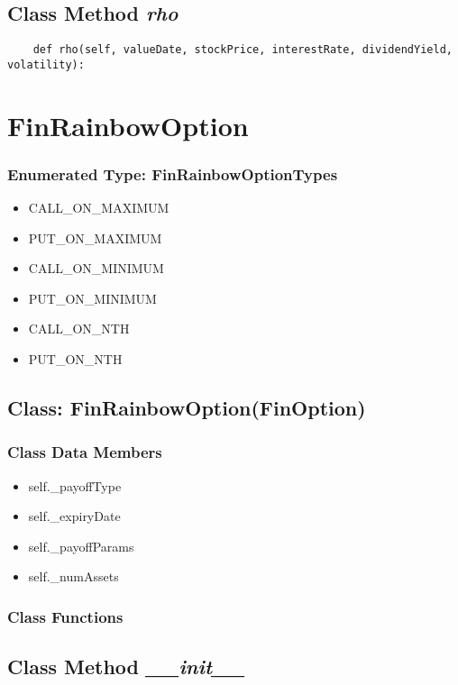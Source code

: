 \documentclass[twoside,11pt]{book}
\begin{document}
\subsection{Class Method {\it rho}}


\begin{lstlisting}
    def rho(self, valueDate, stockPrice, interestRate, dividendYield, volatility):
\end{lstlisting}

\newpage
\section{FinRainbowOption}

\subsubsection{Enumerated Type: FinRainbowOptionTypes}
\begin{itemize}
\item{CALL\_ON\_MAXIMUM}
\item{PUT\_ON\_MAXIMUM}
\item{CALL\_ON\_MINIMUM}
\item{PUT\_ON\_MINIMUM}
\item{CALL\_ON\_NTH}
\item{PUT\_ON\_NTH}
\end{itemize}

\subsection{Class: FinRainbowOption(FinOption)}


\subsubsection{Class Data Members}
\begin{itemize}
\item{self.\_payoffType}
\item{self.\_expiryDate}
\item{self.\_payoffParams}
\item{self.\_numAssets}
\end{itemize}

\subsubsection{Class Functions}

\subsection{Class Method {\it \_\_init\_\_ }}
\end{document}
